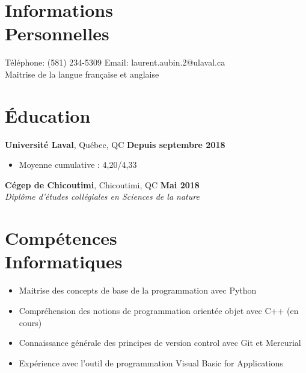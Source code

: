 \documentclass[margin,line]{resume}
\begin{document}
\begin{resume}
    \section{\mysidestyle Informations\\Personnelles}

    T\'{e}l\'{e}phone: (581) 234-5309     \hfill \noindent Email: laurent.aubin.2@ulaval.ca \\
    Maitrise de la langue fran\c{c}aise et anglaise
    

    \section{\mysidestyle \'{E}ducation}

    \textbf{Universit\'{e} Laval}, Qu\'{e}bec, QC \hfill \textbf{Depuis septembre 2018} \vspace{2mm}\\\vspace{1mm}%
    \begin{itemize}[nosep]
        \item Moyenne cumulative : 4,20/4,33
    \end{itemize}
    
      \textbf{C\'{e}gep de Chicoutimi}, Chicoutimi, QC \hfill \textbf{Mai 2018} \vspace{2mm}\\\vspace{1mm}%
    \textsl{Dipl\^{o}me d'\'{e}tudes coll\'{e}giales en Sciences de la nature} 
  
    
    \section{\mysidestyle Comp\'{e}tences\\Informatiques}
     \begin{itemize}[nosep]
        \item Maitrise des concepts de base de la programmation avec Python
        \item Compr\'{e}hension des notions de programmation orient\'{e}e objet avec C++ (en cours)
         \item Connaissance g\'{e}n\'{e}rale des principes de version control avec Git et Mercurial
        \item Exp\'{e}rience avec l'outil de programmation Visual Basic for Applications
    \end{itemize}
    

\end{resume}
\end{document}
